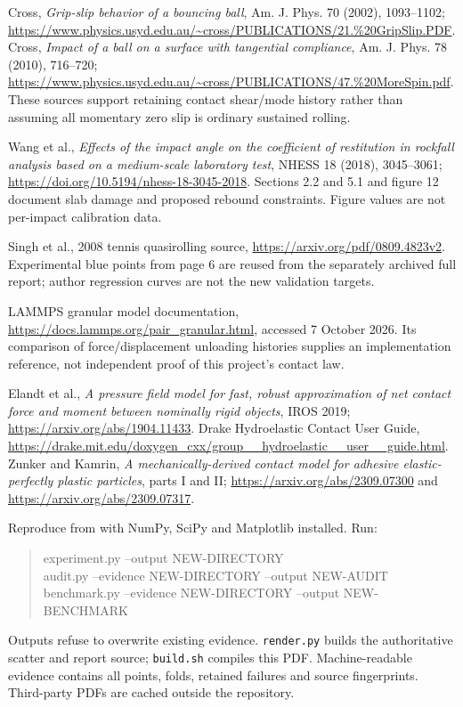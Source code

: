\documentclass[10pt,a4paper]{article}
\begin{document}
Cross, \emph{Grip-slip behavior of a bouncing ball}, Am. J. Phys. 70 (2002),
1093--1102; \url{https://www.physics.usyd.edu.au/~cross/PUBLICATIONS/21.\%20GripSlip.PDF}.
Cross, \emph{Impact of a ball on a surface with tangential compliance},
Am. J. Phys. 78 (2010), 716--720;
\url{https://www.physics.usyd.edu.au/~cross/PUBLICATIONS/47.\%20MoreSpin.pdf}.
These sources support retaining contact shear/mode history rather than assuming
all momentary zero slip is ordinary sustained rolling.

Wang et al., \emph{Effects of the impact angle on the coefficient of restitution
in rockfall analysis based on a medium-scale laboratory test}, NHESS 18 (2018),
3045--3061; \url{https://doi.org/10.5194/nhess-18-3045-2018}.
Sections 2.2 and 5.1 and figure 12 document slab damage and proposed rebound
constraints. Figure values are not per-impact calibration data.

Singh et al., 2008 tennis quasirolling source,
\url{https://arxiv.org/pdf/0809.4823v2}. Experimental blue points from page 6 are
reused from the separately archived full report; author regression curves are
not the new validation targets.

LAMMPS granular model documentation,
\url{https://docs.lammps.org/pair_granular.html}, accessed 7 October 2026.
Its comparison of force/displacement unloading histories supplies an implementation
reference, not independent proof of this project's contact law.

Elandt et al., \emph{A pressure field model for fast, robust approximation of net
contact force and moment between nominally rigid objects}, IROS 2019;
\url{https://arxiv.org/abs/1904.11433}.
Drake Hydroelastic Contact User Guide,
\url{https://drake.mit.edu/doxygen_cxx/group__hydroelastic__user__guide.html}.
Zunker and Kamrin, \emph{A mechanically-derived contact model for adhesive
elastic-perfectly plastic particles}, parts I and II;
\url{https://arxiv.org/abs/2309.07300} and
\url{https://arxiv.org/abs/2309.07317}.

Reproduce from  with NumPy, SciPy and
Matplotlib installed. Run:
\begin{quote}\ttfamily\small
experiment.py --output NEW-DIRECTORY\\
audit.py --evidence NEW-DIRECTORY --output NEW-AUDIT\\
benchmark.py --evidence NEW-DIRECTORY --output NEW-BENCHMARK
\end{quote}
Outputs refuse to overwrite existing evidence. \texttt{render.py} builds the
authoritative scatter and report source; \texttt{build.sh} compiles this PDF.
Machine-readable evidence contains all points, folds, retained failures and
source fingerprints. Third-party PDFs are cached outside the repository.
\end{document}
